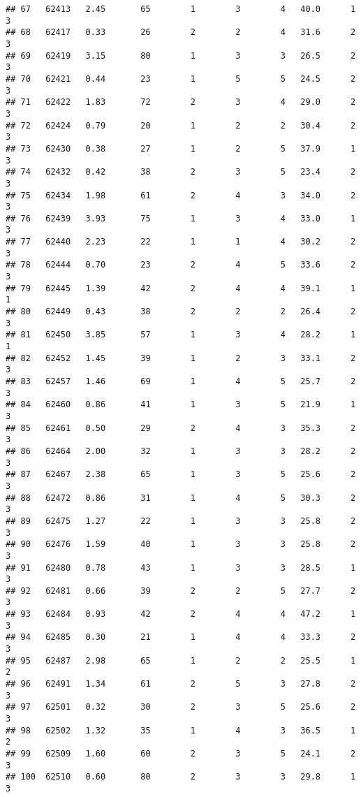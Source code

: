 \documentclass[
]{article}
\begin{document}
\begin{verbatim}
## 67   62413   2.45       65        1        3        4   40.0      1      3
## 68   62417   0.33       26        2        2        4   31.6      2      3
## 69   62419   3.15       80        1        3        3   26.5      2      3
## 70   62421   0.44       23        1        5        5   24.5      2      3
## 71   62422   1.83       72        2        3        4   29.0      2      3
## 72   62424   0.79       20        1        2        2   30.4      2      3
## 73   62430   0.38       27        1        2        5   37.9      1      3
## 74   62432   0.42       38        2        3        5   23.4      2      3
## 75   62434   1.98       61        2        4        3   34.0      2      3
## 76   62439   3.93       75        1        3        4   33.0      1      3
## 77   62440   2.23       22        1        1        4   30.2      2      3
## 78   62444   0.70       23        2        4        5   33.6      2      3
## 79   62445   1.39       42        2        4        4   39.1      1      1
## 80   62449   0.43       38        2        2        2   26.4      2      3
## 81   62450   3.85       57        1        3        4   28.2      1      1
## 82   62452   1.45       39        1        2        3   33.1      2      3
## 83   62457   1.46       69        1        4        5   25.7      2      3
## 84   62460   0.86       41        1        3        5   21.9      1      3
## 85   62461   0.50       29        2        4        3   35.3      2      3
## 86   62464   2.00       32        1        3        3   28.2      2      3
## 87   62467   2.38       65        1        3        5   25.6      2      3
## 88   62472   0.86       31        1        4        5   30.3      2      3
## 89   62475   1.27       22        1        3        3   25.8      2      3
## 90   62476   1.59       40        1        3        3   25.8      2      3
## 91   62480   0.78       43        1        3        3   28.5      1      3
## 92   62481   0.66       39        2        2        5   27.7      2      3
## 93   62484   0.93       42        2        4        4   47.2      1      3
## 94   62485   0.30       21        1        4        4   33.3      2      3
## 95   62487   2.98       65        1        2        2   25.5      1      2
## 96   62491   1.34       61        2        5        3   27.8      2      3
## 97   62501   0.32       30        2        3        5   25.6      2      3
## 98   62502   1.32       35        1        4        3   36.5      1      2
## 99   62509   1.60       60        2        3        5   24.1      2      3
## 100  62510   0.60       80        2        3        3   29.8      1      3

\end{verbatim}
\end{document}
